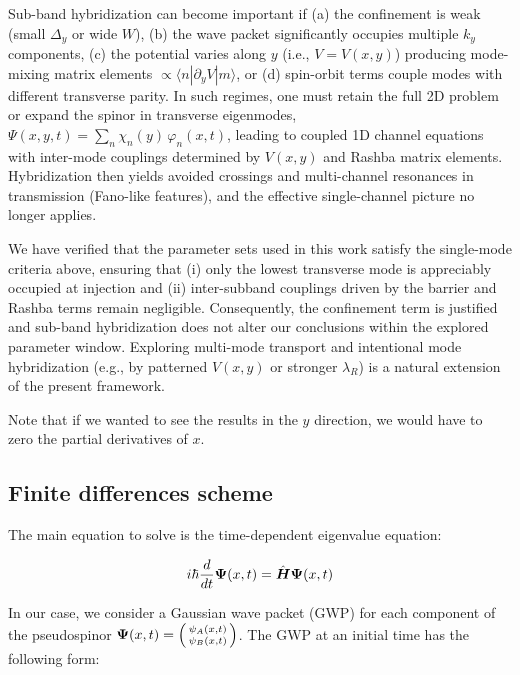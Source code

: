 Sub-band hybridization can become important if (a) the confinement is weak (small $\Delta_y$ or wide $W$), (b) the wave packet significantly occupies multiple $k_y$ components, (c) the potential varies along $y$ (i.e., $V=V(x,y)$) producing mode-mixing matrix elements $\propto\langle n|\partial_y V|m\rangle$, or (d) spin-orbit terms couple modes with different transverse parity.
In such regimes, one must retain the full 2D problem or expand the spinor in transverse eigenmodes,
$\Psi(x,y,t)=\sum_n \chi_n(y)\, \varphi_n(x,t)$,
leading to coupled 1D channel equations with inter-mode couplings determined by $V(x,y)$ and Rashba matrix elements.
Hybridization then yields avoided crossings and multi-channel resonances in transmission (Fano-like features), and the effective single-channel picture no longer applies\cite{MiroshnichenkoRevModPhys2010}.

We have verified that the parameter sets used in this work satisfy the single-mode criteria above, ensuring that (i) only the lowest transverse mode is appreciably occupied at injection and (ii) inter-subband couplings driven by the barrier and Rashba terms remain negligible.
Consequently, the confinement term is justified and sub-band hybridization does not alter our conclusions within the explored parameter window.
Exploring multi-mode transport and intentional mode hybridization (e.g., by patterned $V(x,y)$ or stronger $\lambda_R$) is a natural extension of the present framework.

Note that if we wanted to see the results in the $y$ direction, we would have to zero the partial derivatives of $x$.

\subsection{Finite differences scheme}\label{subsec:finite-differences-scheme}

The main equation to solve is the time-dependent eigenvalue equation:

\begin{equation}
    \label{eq:schrodingerTimeDependent}
    i\hbar \frac{d}{dt}\mbox{\boldmath $\Psi$}(x,t) = \hat{\mbox{\boldmath $H$}}\mbox{\boldmath $\Psi$}(x,t)
\end{equation}

In our case, we consider a Gaussian wave packet (GWP) for each component of the pseudospinor $\bn{\Psi}(x,t)=\begin{psmallmatrix*}
                                                                                                                           \psi_A(x,t)\\\psi_B(x,t)
\end{psmallmatrix*}$.
The GWP at an initial time has the following form:

